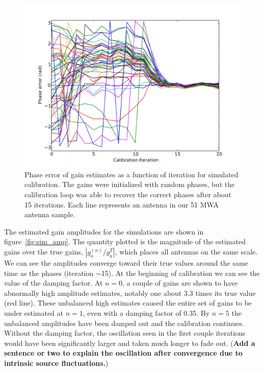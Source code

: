 \documentclass[a4paper,fleqn,usenatbib]{../mnras}
\begin{document}
\begin{figure}
\begin{center}
\includegraphics[width=\columnwidth]{figures/cal_paper_sim_phase.pdf}
\caption{Phase error of gain estimates as a function of iteration for simulated calibration. The gains were initialized with random phases, but the calibration loop was able to recover the correct phases after about 15 iterations. Each line represents an antenna in our 51 MWA antenna sample.
}
\label{fig:sim_phase}
\end{center}
\end{figure}

The estimated gain amplitudes for the simulations are shown in figure~\ref{fig:sim_amp}. The quantity plotted is the magnitude of the estimated gains over the true gains, $\left|g^{(n)}_a/g^T_a\right|$, which places all antennas on the same scale. We can see the amplitudes converge toward their true values around the same time as the phases (iteration $\sim$15). At the beginning of calibration we can see the value of the damping factor. At $n=0$, a couple of gains are shown to have abnormally high amplitude estimates, notably one about 3.3 times its true value (red line). These unbalanced high estimates caused the entire set of gains to be under estimated at $n=1$, even with a damping factor of 0.35. By $n=5$ the unbalanced amplitudes have been damped out and the calibration continues. Without the damping factor, the oscillation seen in the first couple iterations would have been significantly larger and taken much longer to fade out. ({\bf Add a sentence or two to explain the oscillation after convergence due to intrinsic source fluctuations.})
\end{document}
